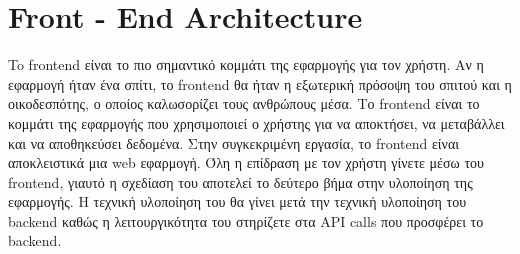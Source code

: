 \thispagestyle{empty}

\chapter{Front - End Architecture}

To frontend είναι το πιο σημαντικό κομμάτι της εφαρμογής για τον χρήστη. Αν η εφαρμογή ήταν ένα σπίτι, το frontend θα ήταν η εξωτερική πρόσοψη του σπιτού και η οικοδεσπότης, ο οποίος καλωσορίζει τους ανθρώπους μέσα.  Το frontend είναι το κομμάτι της εφαρμογής που χρησιμοποιεί ο χρήστης για να αποκτήσει, να μεταβάλλει και να αποθηκεύσει δεδομένα. Στην συγκεκριμένη εργασία, το frontend είναι αποκλειστικά μια web εφαρμογή.
\newline
Όλη η επίδραση με τον χρήστη γίνετε μέσω του frontend, γιαυτό η σχεδίαση του αποτελεί το δεύτερο βήμα στην υλοποίηση της εφαρμογής. Η τεχνική υλοποίηση του θα γίνει μετά την τεχνική υλοποίηση του backend καθώς η λειτουργικότητα του στηρίζετε στα API calls που προσφέρει το backend.

\vspace{60mm}

